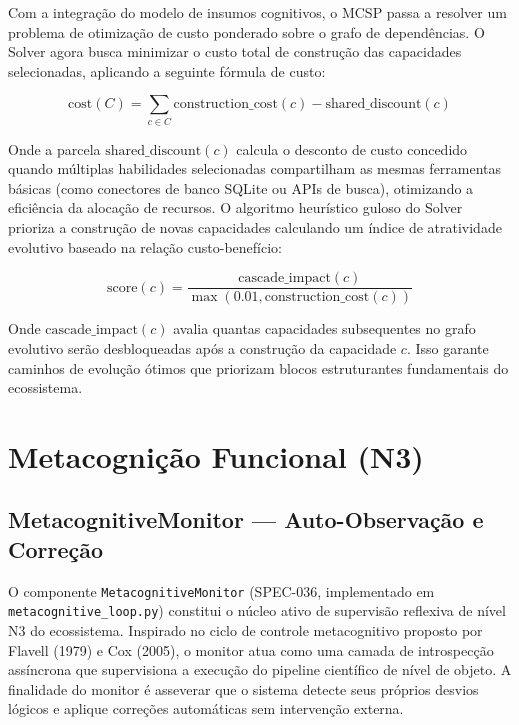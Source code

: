 \documentclass[12pt,a4paper,oneside]{abntex2}
\begin{document}
Com a integração do modelo de insumos cognitivos, o MCSP passa a resolver um problema de otimização de custo ponderado sobre o grafo de dependências. O Solver agora busca minimizar o custo total de construção das capacidades selecionadas, aplicando a seguinte fórmula de custo:

\begin{equation}
\text{cost}(C) = \sum_{c \in C} \text{construction\_cost}(c) - \text{shared\_discount}(c)
\end{equation}

Onde a parcela $\text{shared\_discount}(c)$ calcula o desconto de custo concedido quando múltiplas habilidades selecionadas compartilham as mesmas ferramentas básicas (como conectores de banco SQLite ou APIs de busca), otimizando a eficiência da alocação de recursos. O algoritmo heurístico guloso do Solver prioriza a construção de novas capacidades calculando um índice de atratividade evolutivo baseado na relação custo-benefício:

\begin{equation}
\text{score}(c) = \frac{\text{cascade\_impact}(c)}{\max(0.01, \text{construction\_cost}(c))}
\end{equation}

Onde $\text{cascade\_impact}(c)$ avalia quantas capacidades subsequentes no grafo evolutivo serão desbloqueadas após a construção da capacidade $c$. Isso garante caminhos de evolução ótimos que priorizam blocos estruturantes fundamentais do ecossistema.

\chapter{Metacognição Funcional (N3)}
\label{ch:metacognicao}

\section{MetacognitiveMonitor — Auto-Observação e Correção}

O componente \texttt{MetacognitiveMonitor} (SPEC-036, implementado em \texttt{metacognitive\_loop.py}) constitui o núcleo ativo de supervisão reflexiva de nível N3 do ecossistema. Inspirado no ciclo de controle metacognitivo proposto por Flavell (1979) e Cox (2005), o monitor atua como uma camada de introspecção assíncrona que supervisiona a execução do pipeline científico de nível de objeto. A finalidade do monitor é asseverar que o sistema detecte seus próprios desvios lógicos e aplique correções automáticas sem intervenção externa.
\end{document}
